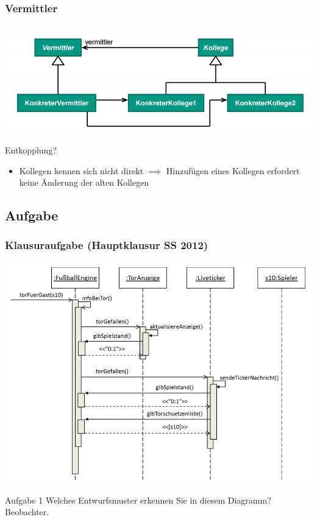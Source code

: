 \documentclass[18pt]{beamer}
\begin{document}
	\begin{frame}
		\frametitle{Vermittler}
		\centering
		\includegraphics[scale=0.45]{./pics/tut3/med.png}
		\begin{block}{Entkopplung?}
			\begin{itemize}
				\pause 
				\item Kollegen kennen sich nicht direkt  \linebreak \pause $\implies$ Hinzufügen eines Kollegen erfordert keine Änderung der alten Kollegen
			\end{itemize}
		\end{block}
	\end{frame}

	\subsection{Aufgabe}
	\begin{frame}
		\frametitle{Klausuraufgabe (Hauptklausur SS 2012)}
		\includegraphics[scale=0.35]{./pics/tut3/obs-task.png}	
		\begin{block}{Aufgabe 1}
			Welches Entwurfsmuster erkennen Sie in diesem Diagramm? \pause
			Beobachter.
		\end{block}
	\end{frame}
\end{document}
